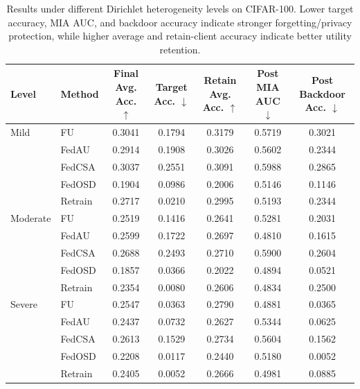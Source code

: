 \begin{table}[t]
\centering
\caption{Results under different Dirichlet heterogeneity levels on CIFAR-100. Lower target accuracy, MIA AUC, and backdoor accuracy indicate stronger forgetting/privacy protection, while higher average and retain-client accuracy indicate better utility retention.}
\label{tab:heterogeneity_results}
\begin{tabular}{llccccc}
\toprule
Level & Method & Final Avg. Acc. $\uparrow$ & Target Acc. $\downarrow$ & Retain Avg. Acc. $\uparrow$ & Post MIA AUC $\downarrow$ & Post Backdoor Acc. $\downarrow$ \\
\midrule
Mild & FU & 0.3041 & 0.1794 & 0.3179 & 0.5719 & 0.3021 \\
 & FedAU & 0.2914 & 0.1908 & 0.3026 & 0.5602 & 0.2344 \\
 & FedCSA & 0.3037 & 0.2551 & 0.3091 & 0.5988 & 0.2865 \\
 & FedOSD & 0.1904 & 0.0986 & 0.2006 & 0.5146 & 0.1146 \\
 & Retrain & 0.2717 & 0.0210 & 0.2995 & 0.5193 & 0.2344 \\
\midrule
Moderate & FU & 0.2519 & 0.1416 & 0.2641 & 0.5281 & 0.2031 \\
 & FedAU & 0.2599 & 0.1722 & 0.2697 & 0.4810 & 0.1615 \\
 & FedCSA & 0.2688 & 0.2493 & 0.2710 & 0.5900 & 0.2604 \\
 & FedOSD & 0.1857 & 0.0366 & 0.2022 & 0.4894 & 0.0521 \\
 & Retrain & 0.2354 & 0.0080 & 0.2606 & 0.4834 & 0.2500 \\
\midrule
Severe & FU & 0.2547 & 0.0363 & 0.2790 & 0.4881 & 0.0365 \\
 & FedAU & 0.2437 & 0.0732 & 0.2627 & 0.5344 & 0.0625 \\
 & FedCSA & 0.2613 & 0.1529 & 0.2734 & 0.5604 & 0.1562 \\
 & FedOSD & 0.2208 & 0.0117 & 0.2440 & 0.5180 & 0.0052 \\
 & Retrain & 0.2405 & 0.0052 & 0.2666 & 0.4981 & 0.0885 \\
\bottomrule
\end{tabular}
\end{table}